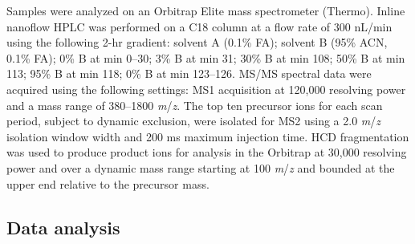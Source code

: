 \documentclass[11pt,letter]{article}\usepackage[]{graphicx}\usepackage[]{color}
\newcommand{\liter}{L}
\newcommand{\mz}[1]{#1 \textit{m}/\textit{z}}
\begin{document}
Samples were analyzed on an Orbitrap Elite mass spectrometer (Thermo). Inline
nanoflow HPLC was performed on a C18 column at a flow rate of 300 n\liter/min
using the following 2-hr gradient: solvent A (0.1\% FA); solvent B (95\% ACN,
0.1\% FA); 0\% B at min 0--30; 3\% B at min 31; 30\% B at min 108; 50\% B at
min 113; 95\% B at min 118; 0\% B at min 123--126. MS/MS spectral data were
acquired using the following settings: MS1 acquisition at 120,000 resolving
power and a mass range of \mz{380--1800}. The top ten precursor ions for each
scan period, subject to dynamic exclusion, were isolated for MS2 using a
\mz{2.0} isolation window width and 200 ms maximum injection time. HCD
fragmentation was used to produce product ions for analysis in the Orbitrap at
30,000 resolving power and over a dynamic mass range starting at \mz{100} and
bounded at the upper end relative to the precursor mass. 

\subsection*{Data analysis}
\end{document}
